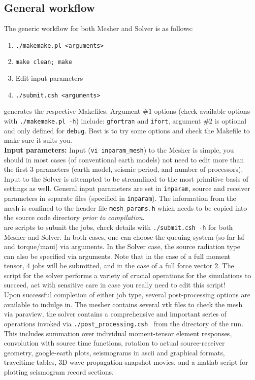 \documentclass[11pt,letter,fleqn,english,notitlepage]{article}
\begin{document}
\subsection{General workflow}
The generic workflow for both Mesher and Solver is as follows:
\begin{enumerate}
\item {\tt ./makemake.pl <arguments>}
\item {\tt make clean; make}
\item Edit input parameters
\item {\tt ./submit.csh <arguments>}
\end{enumerate}

 generates the respective Makefiles. Argument \#1 options 
(check available options with {\tt ./makemake.pl -h}) include:
{\tt gfortran} and {\tt ifort}, argument \#2 is optional and only defined for {\tt debug}. Best is to try some options and 
check the Makefile to make sure it suits you.\\

\noindent \textbf{Input parameters: } Input ({\tt vi inparam\_mesh})
to the Mesher is simple, you should in most cases (of conventional earth models) 
not need to edit more than the first 3 parameters (earth model, seismic period, and number of processors). 
Input to the Solver is attempted to be streamlined to the most primitive basis of settings as well. General 
input parameters are set in {\tt inparam}, source and receiver parameters in separate files (specified 
in {\tt inparam}). The information from the mesh is confined to the header file {\tt mesh\_params.h} 
which needs to be copied into the source code directory \textit{prior to compilation}.\\

 are scripts to submit the jobs, check details with {\tt ./submit.csh -h} for both Mesher and Solver. 
In both cases, one can choose the queuing system (so far lsf and torque/maui) via arguments. In the Solver case, the 
source radiation type can also be specified via arguments. Note that in the case of a full moment tensor, 4 jobs will 
be submitted, and in the case of a full force vector 2. The script for the solver performs a variety of crucial operations 
for the simulations to succeed, act with sensitive care in case you really need to edit this script! \\

\noindent Upon successful completion of either job type, several post-processing options are available to indulge in. The 
mesher contains several vtk files to check the mesh via paraview, the solver contains a comprehensive and important 
series of operations invoked via {\tt ./post\_processing.csh } from the directory of the run. This includes 
summation over individual moment-tensor element responses, convolution with source time functions, rotation to 
actual source-receiver geometry, google-earth plots, seismograms in ascii and graphical formats, 
traveltime tables, 3D wave propagation snapshot movies, and a matlab script for plotting seismogram record sections.
\end{document}
